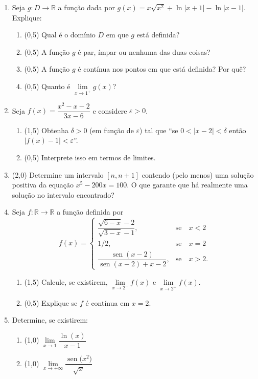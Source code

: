 \documentclass[12pt,a4paper]{article}
\newcommand*\sen[1]{\operatorname{sen}{#1}}
\newcommand*\abs[1]{\left|#1\right|}
\begin{document}
\begin{enumerate}
\item Seja $g: D \to \mathbb{R}$ a função dada por $g(x) = x\sqrt{x^2} + \ln{\abs{x + 1}} - \ln{\abs{x - 1}}$. Explique:
\begin{enumerate}
\item (0,5) Qual é o domínio $D$ em que $g$ está definida?
\item (0,5) A função $g$ é par, ímpar ou nenhuma das duas coisas?
\item (0,5) A função $g$ é contínua nos pontos em que está definida? Por quê?
\item (0,5) Quanto é $\lim\limits_{x\to1^+} g(x)$?
\end{enumerate}

\item Seja $f(x) = \dfrac{x^2 - x - 2}{3x - 6}$ e considere $\varepsilon > 0$.
\begin{enumerate}
\item (1,5) Obtenha $\delta > 0$ (em função de $\varepsilon$) tal que ``se $0 < \abs{x - 2} < \delta$ então $\abs{f(x) - 1} < \varepsilon$''.
\item (0,5) Interprete isso em termos de limites.
\end{enumerate}

\item (2,0) Determine um intervalo $[n, n+1]$ contendo (pelo menos) uma solução positiva da equação $x^5 - 200x = 100$. O que garante que há realmente uma solução no intervalo encontrado?


\item Seja $f: \mathbb{R} \to \mathbb{R}$ a função definida por
\[
f(x) =
\left\{\begin{array}{ll}
\dfrac{\sqrt{6-x}-2}{\sqrt{3-x}-1}, & \text{se}\quad x < 2 \\
1/2, & \text{se}\quad x = 2 \\
\dfrac{\sen{(x-2)}}{\sen{(x-2)} + x-2}, & \text{se}\quad x>2.
\end{array}\right.
\]
\begin{enumerate}
\item (1,5) Calcule, se existirem, $\lim\limits_{x\to 2^-} f(x)$ e $\lim\limits_{x\to 2^+} f(x)$.
\item (0,5) Explique se $f$ é contínua em $x = 2$.
\end{enumerate}

\item Determine, se existirem:
\begin{multicols}{2}
\begin{enumerate}
\item (1,0) $\lim\limits_{x\to 1} \dfrac{\ln(x)}{x-1}$
\item (1,0) $\lim\limits_{x\to +\infty} \dfrac{\sen(x^2)}{\sqrt{x}}$
\end{enumerate}
\end{multicols}


\end{enumerate}
\end{document}
